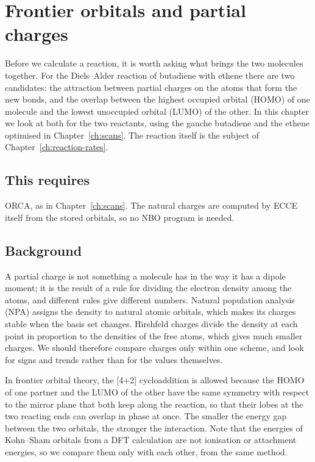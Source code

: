 \chapter{Frontier orbitals and partial charges}
\label{ch:density-views}
\label{sec:dv-fmo}

Before we calculate a reaction, it is worth asking what brings the two molecules together. For the Diels--Alder reaction of butadiene with ethene there are two candidates: the attraction between partial charges on the atoms that form the new bonds, and the overlap between the highest occupied orbital (HOMO) of one molecule and the lowest unoccupied orbital (LUMO) of the other. In this chapter we look at both for the two reactants, using the gauche butadiene and the ethene optimised in Chapter~\ref{ch:scans}. The reaction itself is the subject of Chapter~\ref{ch:reaction-rates}.

\section*{This requires}
ORCA, as in Chapter~\ref{ch:scans}. The natural charges are computed by ECCE itself from the stored orbitals, so no NBO program is needed.

\section{Background}
A partial charge is not something a molecule has in the way it has a dipole moment; it is the result of a rule for dividing the electron density among the atoms, and different rules give different numbers. Natural population analysis (NPA) assigns the density to natural atomic orbitals, which makes its charges stable when the basis set changes. Hirshfeld charges divide the density at each point in proportion to the densities of the free atoms, which gives much smaller charges. We should therefore compare charges only within one scheme, and look for signs and trends rather than for the values themselves.

In frontier orbital theory, the [4+2] cycloaddition is allowed because the HOMO of one partner and the LUMO of the other have the same symmetry with respect to the mirror plane that both keep along the reaction, so that their lobes at the two reacting ends can overlap in phase at once. The smaller the energy gap between the two orbitals, the stronger the interaction. Note that the energies of Kohn--Sham orbitals from a DFT calculation are not ionisation or attachment energies, so we compare them only with each other, from the same method.

